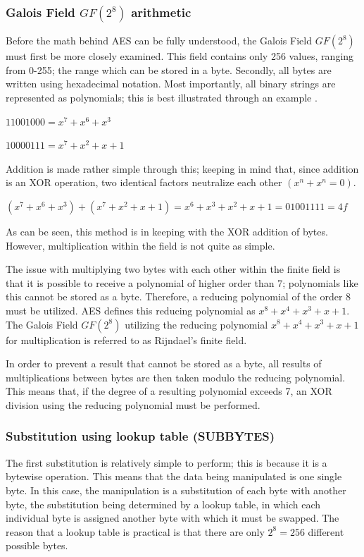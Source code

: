\documentclass[12pt]{report}
\begin{document}
\subsubsection{Galois Field $GF(2^8)$ arithmetic}
Before the math behind AES can be fully understood, the Galois Field $GF(2^8)$ must first be more closely examined. This field contains only 256 values, ranging from 0-255; the range which can be stored in a byte. Secondly, all bytes are written using hexadecimal notation. Most importantly, all binary strings are represented as polynomials; this is best illustrated through an example \cite{GFieldExample}.

$11001000 = x^7+x^6+x^3$

$10000111 = x^7+x^2+x+1$

Addition is made rather simple through this; keeping in mind that, since addition is an XOR operation, two identical factors neutralize each other $(x^n+x^n = 0)$.

$(x^7+x^6+x^3)+(x^7+x^2+x+1) = x^6+x^3+x^2+x+1 = 01001111 = 4f$

As can be seen, this method is in keeping with the XOR addition of bytes. However, multiplication within the field is not quite as simple.

The issue with multiplying two bytes with each other within the finite field is that it is possible to receive a polynomial of higher order than 7; polynomials like this cannot be stored as a byte. Therefore, a reducing polynomial of the order 8 must be utilized. AES defines this reducing polynomial as $x^8+x^4+x^3+x+1$. The Galois Field $GF(2^8)$ utilizing the reducing polynomial $x^8+x^4+x^3+x+1$ for multiplication is referred to as Rijndael's finite field\cite{RFiniteField}.

In order to prevent a result that cannot be stored as a byte, all results of multiplications between bytes are then taken modulo the reducing polynomial. This means that, if the degree of a resulting polynomial exceeds 7, an XOR division using the reducing polynomial must be performed.

\subsubsection{Substitution using lookup table (SUBBYTES)}
The first substitution is relatively simple to perform; this is because it is a bytewise operation. This means that the data being manipulated is one single byte. In this case, the manipulation is a substitution of each byte with another byte, the substitution being determined by a lookup table, in which each individual byte is assigned another byte with which it must be swapped. The reason that a lookup table is practical is that there are only $2^8 = 256$ different possible bytes.
\end{document}

